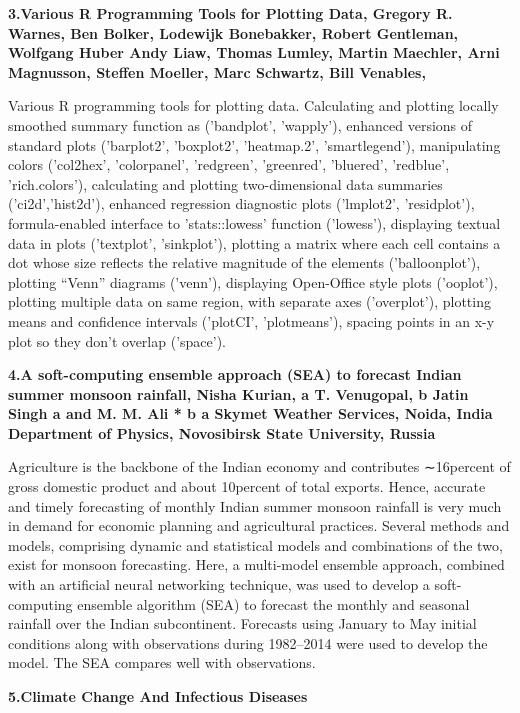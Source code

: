 \documentclass[12pt,a4paper]{report}
\begin{document}
\textbf{3.Various R Programming Tools for Plotting Data, Gregory R. Warnes, Ben Bolker, Lodewijk Bonebakker, Robert
Gentleman, Wolfgang Huber Andy Liaw, Thomas Lumley, Martin
Maechler, Arni Magnusson, Steffen Moeller, Marc Schwartz, Bill
Venables, }

Various R programming tools for plotting data. Calculating and plotting locally smoothed summary function as ('bandplot', 'wapply'), enhanced versions of standard plots ('barplot2', 'boxplot2',
'heatmap.2', 'smartlegend'), manipulating colors ('col2hex', 'colorpanel', 'redgreen',
'greenred', 'bluered', 'redblue', 'rich.colors'),  calculating and plotting two-dimensional data summaries ('ci2d','hist2d'), enhanced regression diagnostic plots ('lmplot2', 'residplot'),
formula-enabled interface to 'stats::lowess' function ('lowess'),
displaying textual data in plots ('textplot', 'sinkplot'),
plotting a matrix where each cell contains a dot whose size
reflects the relative magnitude of the elements ('balloonplot'),
plotting ``Venn'' diagrams ('venn'),
displaying Open-Office style plots ('ooplot'),
plotting multiple data on same region, with separate axes
('overplot'),
plotting means and confidence intervals ('plotCI', 'plotmeans'),
spacing points in an x-y plot so they don't overlap ('space').


\newpage
\textbf{4.A soft-computing ensemble approach (SEA) to forecast Indian summer
monsoon rainfall, Nisha Kurian, a T. Venugopal, b Jatin Singh a and M. M. Ali *
b
a
Skymet Weather Services, Noida, India
Department of Physics, Novosibirsk State University, Russia}

Agriculture is the backbone of the Indian economy and contributes ∼16percent of gross domestic product and about
10percent of total exports. Hence, accurate and timely forecasting of monthly Indian summer monsoon rainfall is very much in
demand for economic planning and agricultural practices. Several methods and models, comprising dynamic and statistical
models and combinations of the two, exist for monsoon forecasting. Here, a multi-model ensemble approach, combined with
an artificial neural networking technique, was used to develop a soft-computing ensemble algorithm (SEA) to forecast the
monthly and seasonal rainfall over the Indian subcontinent. Forecasts using January to May initial conditions along with
observations during 1982–2014 were used to develop the model. The SEA compares well with observations.

\textbf{5.Climate
Change And
Infectious
Diseases}
\end{document}
